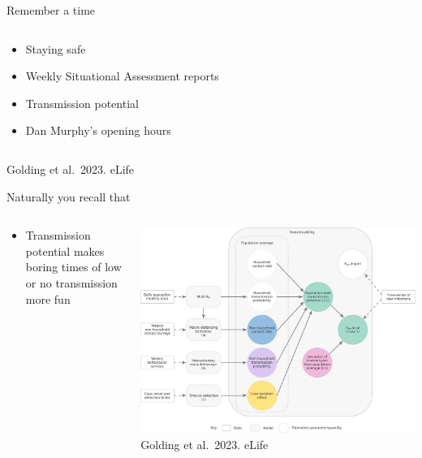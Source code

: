 \documentclass[
  ignorenonframetext,
]{beamer}
\providecommand{\tightlist}{%
  \setlength{\itemsep}{0pt}\setlength{\parskip}{0pt}}\usepackage{longtable,booktabs,array}
\begin{document}
\begin{frame}{Remember a time}
\begin{columns}[T]
\begin{column}{0.3\textwidth}
\begin{itemize}
\tightlist
\item
  Staying safe \pause
\item
  Weekly Situational Assessment reports \pause
\item
  Transmission potential \pause
\item
  Dan Murphy's opening hours
\end{itemize}
\end{column}
\end{columns}

Golding et al.~2023. eLife
\end{frame}

\begin{frame}{Naturally you recall that}
\label{naturally-you-recall-that}
\begin{columns}[T]
\begin{column}{0.4\textwidth}
\begin{itemize}
\tightlist
\item
  Transmission potential makes boring times of low or no transmission
  more fun
\end{itemize}
\end{column}

\begin{column}{0.7\textwidth}
\includegraphics{images/tp_model_schema.jpg} Golding et al.~2023. eLife
\end{column}
\end{columns}
\end{frame}
\end{document}
